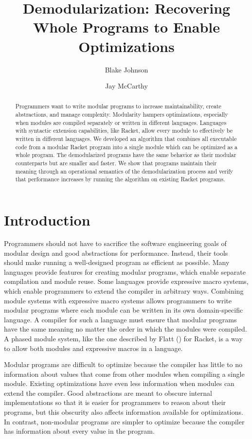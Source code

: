 \documentclass{llncs}
\begin{document}
\title{Demodularization: Recovering Whole Programs to Enable Optimizations} 
\author{Blake Johnson \and Jay McCarthy}
\maketitle
\begin{abstract}
Programmers want to write modular programs to increase maintainability, create abstractions, and manage complexity.
Modularity hampers optimizations, especially when modules are compiled separately or written in different languages.
Languages with syntactic extension capabilities, like Racket, allow every module to effectively be written in different languages.
We developed an algorithm that combines all executable code from a modular Racket program into a single module which can be optimized as a whole program.
The demodularized programs have the same behavior as their modular counterparts but are smaller and faster.
We show that programs maintain their meaning through an operational semantics of the demodularization process and verify that performance increases by running the algorithm on existing Racket programs.
\end{abstract}

\section{Introduction}

Programmers should not have to sacrifice the software engineering goals of modular design and good abstractions for performance. 
Instead, their tools should make running a well-designed program as efficient as possible. 
Many languages provide features for creating modular programs, which enable separate compilation and module reuse.
Some languages provide expressive macro systems, which enable programmers to extend the compiler in arbitrary ways.
Combining module systems with expressive macro systems allows programmers to write modular programs where each module can be written in its own domain-specific language.
A compiler for such a language must ensure that modular programs have the same meaning no matter the order in which the modules were compiled.
A phased module system, like the one described by Flatt () for Racket, is a way to allow both modules and expressive macros in a language.

Modular programs are difficult to optimize because the compiler has little to no information about values that come from other modules when compiling a single module.
Existing optimizations have even less information when modules can extend the compiler. 
Good abstractions are meant to obscure internal implementations so that it is easier for programmers to reason about their programs, but this obscurity also affects information available for optimizations.  
In contrast, non-modular programs are simpler to optimize because the compiler has information about every value in the program.
\end{document}
